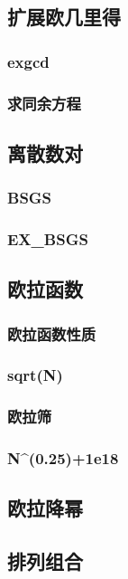 \documentclass[10pt,a4paper]{article}
\begin{document}
\subsection{扩展欧几里得}
\subsubsection{exgcd}

\subsubsection{求同余方程}

\subsection{离散数对}
\subsubsection{BSGS}

\subsubsection{EX_BSGS}

\subsection{欧拉函数}
\subsubsection{欧拉函数性质}

\subsubsection{sqrt(N)}

\subsubsection{欧拉筛}

\subsubsection{N^(0.25)+1e18}

\subsection{欧拉降幂}
\subsection{排列组合}
\end{document}

